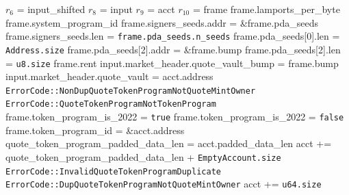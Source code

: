 \begin{algorithm}
\caption{INIT-QUOTE-VAULT}
\begin{algorithmic}
  \INPUT $r_6$ = input\_shifted
  \INPUT $r_8$ = input
  \INPUT $r_9$ = acct
  \INPUT $r_{10}$ = frame
  \REQUIRE frame.lamports\_per\_byte
  \REQUIRE frame.system\_program\_id
  \REQUIRE frame.signers\_seeds.addr = \&frame.pda\_seeds
  \REQUIRE frame.signers\_seeds.len = \texttt{frame.pda\_seeds.n\_seeds}
  \REQUIRE frame.pda\_seeds[0].len = \texttt{Address.size}
  \REQUIRE frame.pda\_seeds[2].addr = \&frame.bump
  \REQUIRE frame.pda\_seeds[2].len = \texttt{u8.size}
  \REQUIRE frame.rent
  \ENSURE input.market\_header.quote\_vault\_bump = frame.bump
  \ENSURE input.market\_header.quote\_vault = acct.address
      \RETURN \texttt{ErrorCode::NonDupQuoteTokenProgramNotQuoteMintOwner}
    \ENDIF
        \RETURN \texttt{ErrorCode::QuoteTokenProgramNotTokenProgram}
      \ENDIF
      \STATE frame.token\_program\_is\_2022 = \texttt{true}
    \ELSE
      \STATE frame.token\_program\_is\_2022 = \texttt{false}
    \ENDIF
    \STATE frame.token\_program\_id = \&acct.address
    \STATE quote\_token\_program\_padded\_data\_len = acct.padded\_data\_len
    \STATE acct += quote\_token\_program\_padded\_data\_len + \texttt{EmptyAccount.size}
  \ELSE
      \RETURN \texttt{ErrorCode::InvalidQuoteTokenProgramDuplicate}
    \ENDIF
      \RETURN \texttt{ErrorCode::DupQuoteTokenProgramNotQuoteMintOwner}
    \ENDIF
    \STATE acct += \texttt{u64.size}
  \ENDIF

\end{algorithmic}
\end{algorithm}
